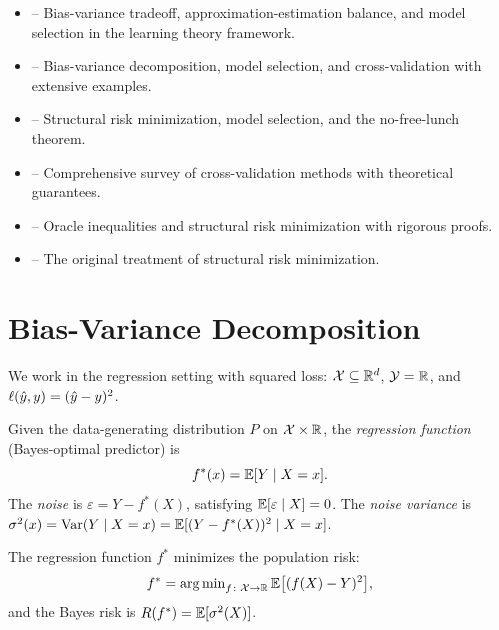 \documentclass[11pt,a4paper]{article}
\begin{document}
\begin{itemize}
    \item \citet[Chapter 3]{bach2024} -- Bias-variance tradeoff,
    approximation-estimation balance, and model selection in the
    learning theory framework.
    \item \citet[Chapters 2--4]{hastie2009} -- Bias-variance
    decomposition, model selection, and cross-validation with
    extensive examples.
    \item \citet[Chapters 5, 7, 11]{shalev2014} -- Structural risk
    minimization, model selection, and the no-free-lunch theorem.
    \item \citet{arlot2010} -- Comprehensive survey of
    cross-validation methods with theoretical guarantees.
    \item \citet[Chapter 8]{devroye1996} -- Oracle inequalities and
    structural risk minimization with rigorous proofs.
    \item \citet[Chapters 7--8]{vapnik1998} -- The original treatment
    of structural risk minimization.
\end{itemize}


\section{Bias-Variance Decomposition}
\label{sec:bias_variance}

We work in the regression setting with squared loss:
$\mathcal{X} \subseteq \mathbb{R}^d$, $\mathcal{Y} = \mathbb{R}$, and
$\ell(\hat{y}, y) = (\hat{y} - y)^2$.

\begin{definition}
\label{def:regression_function}
Given the data-generating distribution $P$ on $\mathcal{X} \times
\mathbb{R}$, the \emph{regression function} (Bayes-optimal predictor) is
\[
    f^*(x) = \mathbb{E}[Y \mid X = x].
\]
The \emph{noise} is $\varepsilon = Y - f^*(X)$, satisfying
$\mathbb{E}[\varepsilon \mid X] = 0$.  The \emph{noise variance} is
$\sigma^2(x) = \operatorname{Var}(Y \mid X = x) = \mathbb{E}[(Y - f^*(X))^2 \mid X = x]$.
\end{definition}

\begin{proposition}
\label{prop:bayes_squared}
The regression function $f^*$ minimizes the population risk:
\[
    f^* = \operatorname{arg\,min}_{f \colon \mathcal{X} \to \mathbb{R}}
    \mathbb{E}\bigl[(f(X) - Y)^2\bigr],
\]
and the Bayes risk is $R(f^*) = \mathbb{E}[\sigma^2(X)]$.
\end{proposition}
\end{document}
